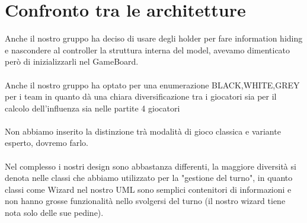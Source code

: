 \documentclass[12pt]{article}
\begin{document}
\section{Confronto tra le architetture}

Anche il nostro gruppo ha deciso di usare degli holder per fare information hiding e nascondere al controller la struttura interna del model, avevamo dimenticato però di inizializzarli nel GameBoard.\\
\\
Anche il nostro gruppo ha optato per una enumerazione BLACK,WHITE,GREY per i team in quanto dà una chiara diversificazione tra i giocatori sia per il calcolo dell'influenza sia nelle partite 4 giocatori\\
\\
Non abbiamo inserito la distinzione trà modalità di gioco classica e variante esperto, dovremo farlo.\\
\\
Nel complesso i nostri design sono abbastanza differenti, la maggiore diversità si denota nelle classi che abbiamo utilizzato per la "gestione del turno", in quanto classi come Wizard nel nostro UML sono semplici contenitori di informazioni e non hanno grosse funzionalità nello svolgersi del turno (il nostro wizard tiene nota solo delle sue pedine).\\
\end{document}
